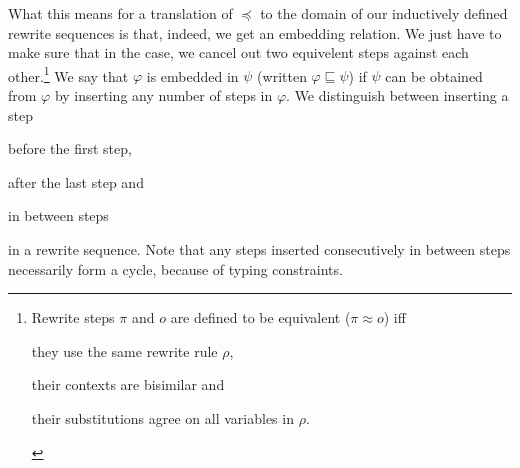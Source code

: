 What this means for a translation of $\preceq$ to the domain of our
inductively defined rewrite sequences is that, indeed, we get an embedding
relation. We just have to make sure that in the
 case, we cancel out two
equivelent steps against each other.\footnote{Rewrite steps $\pi$ and $o$ are
  defined to be equivalent ($\pi \approx o$) iff %
\begin{compactenum}
  \item they use the same rewrite rule $\rho$,
  \item their contexts are bisimilar and
  \item their substitutions agree on all variables in $\rho$.
\end{compactenum}}
We say that $\varphi$ is embedded in $\psi$ (written $\varphi
\sqsubseteq \psi$) if $\psi$ can be obtained from $\varphi$ by inserting
any number of steps in $\varphi$. We distinguish between inserting a step
\begin{inparaenum}[(i)]
  \item before the first step,
  \item after the last step and
  \item in between steps
\end{inparaenum}
in a rewrite sequence. Note that any steps inserted consecutively in between
steps necessarily form a cycle, because of typing constraints.
